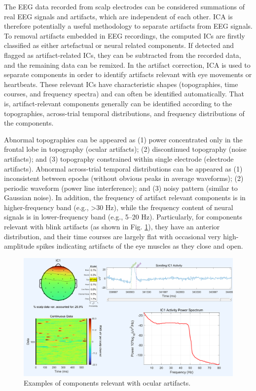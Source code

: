 \documentclass[12pt,a4paper,titlepage,openany]{report}
\begin{document}
The EEG data recorded from scalp electrodes can be considered summations of real EEG signals and artifacts, which are independent of each other. ICA is therefore potentially a useful methodology to separate artifacts from EEG signals. To removal artifacts embedded in EEG recordings, the computed ICs are ﬁrstly classiﬁed as either artefactual or neural related components. If detected and ﬂagged as artifact-related ICs, they can be subtracted from the recorded data, and the remaining data can be remixed. In the artifact correction, ICA is used to separate components in order to identify artifacts relevant with eye movements or heartbeats. 
These relevant ICs have characteristic shapes (topographies, time courses, and frequency spectra) and can often be identiﬁed automatically. 
That is, artifact-relevant components generally can be identiﬁed according to the topographies, across-trial temporal distributions, and frequency distributions of the components. 

Abnormal topographies can be appeared as (1) power concentrated only in the frontal lobe in topography (ocular artifacts); (2) discontinued topography (noise artifacts); and (3) topography constrained within single electrode (electrode artifacts). 
Abnormal across-trial temporal distributions can be appeared as (1) inconsistent between epochs (without obvious peaks in average waveforms); (2) periodic waveform (power line interference); and (3) noisy pattern (similar to Gaussian noise). 
In addition, the frequency of artifact relevant components is in higher-frequency band (e.g., \textgreater 30 Hz), while the frequency content of neural signals is in lower-frequency band (e.g., 5–20 Hz). 
Particularly, for components relevant with blink artifacts (as shown in Fig. \ref{fig:ICA}), they have an anterior distribution, and their time courses are largely ﬂat with occasional very high-amplitude spikes indicating artifacts of the eye muscles as they close and open.

\begin{figure}[h]
     \centering
     \includegraphics[width=1\linewidth]{./Chapter3_Methodology/Eye-blink via ICA label.png}
     \caption{Examples of components relevant with ocular artifacts.}
     \label{fig:ICA}
\end{figure}
\end{document}
